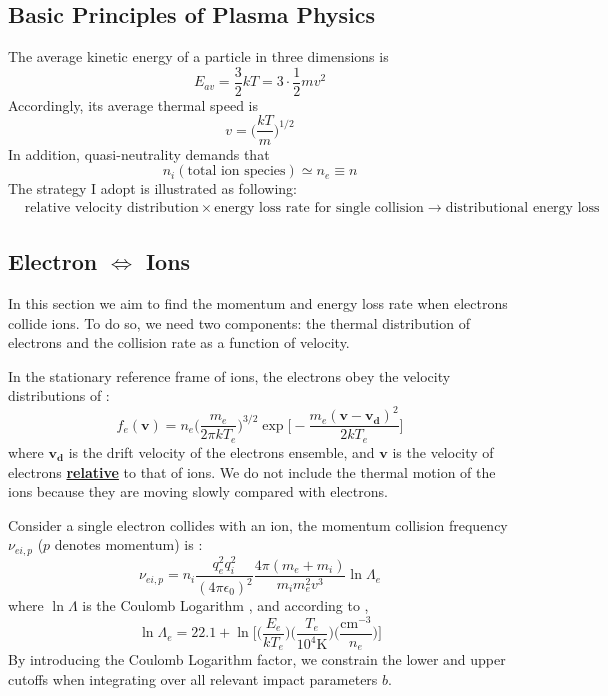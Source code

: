 \documentclass{article}
\begin{document}
\subsection{Basic Principles of Plasma Physics}
The average kinetic energy of a particle in three dimensions is
\begin{equation}
	E_{av} = \frac{3}{2}kT = 3 \cdot \frac{1}{2} m v^2
\end{equation}
Accordingly, its average thermal speed is
\begin{equation}
	v = \Big(\frac{kT}{m} \Big)^{1/2}
\end{equation}
In addition, quasi-neutrality demands that
\begin{equation}
	n_i (\text{total ion species}) \simeq n_e \equiv n
\end{equation}
The strategy I adopt is illustrated as following:
\begin{equation*}
	\begin{split}
		&\text{relative velocity distribution} \times \text{energy loss rate for single collision} \rightarrow \text{distributional energy loss }
	\end{split}
\end{equation*}
\subsection{Electron $\Longleftrightarrow$ Ions}
In this section we aim to find the momentum and energy loss rate when electrons collide ions. To do so, we need two components: the thermal distribution of electrons and the collision rate as a function of velocity. 

In the stationary reference frame of ions, the electrons obey the velocity distributions of \cite{Fitzpatrick:2014pp}:
\begin{equation}
	\label{eq_f_e}
	f_e(\bm{v}) = n_e \Big(\frac{m_e}{2\pi kT_e} \Big)^{3/2} \exp\Big[-\frac{m_e(\bm{v} - \bm{v_d})^2}{2kT_e} \Big]
\end{equation}
where $\bm{v_d}$ is the drift velocity of the electrons ensemble, and $\bm{v}$ is the velocity of electrons \underline{\textbf{relative}} to that of ions. We do not include the thermal motion of the ions because they are moving slowly compared with electrons.

Consider a single electron collides with an ion, the momentum collision frequency $\nu_{ei,p}$ ($p$ denotes momentum) is \cite{Chen:2016it}:
\begin{equation}
	\label{eq_nu_ei}
	\nu_{ei,p} = n_i\frac{q_e^2 q_i^2}{(4\pi \epsilon_0 )^2}\frac{4\pi(m_e+m_i)}{m_i m_e^2 v^3} \ln \Lambda_e
\end{equation}
where $\ln \Lambda$ is the Coulomb Logarithm , and according to \cite{Draine:2011po},
\begin{equation}
	\label{eq_lambda_e}
	\ln \Lambda_e = 22.1 + \ln \Big[\Big(\frac{E_e}{kT_e} \Big)\Big(\frac{T_e}{10^4 \text{K}} \Big)\Big(\frac{\text{cm}^{-3}}{n_e} \Big) \Big]
\end{equation}
By introducing the Coulomb Logarithm factor, we constrain the lower and upper cutoffs when integrating over all relevant impact parameters $b$.
\end{document}
